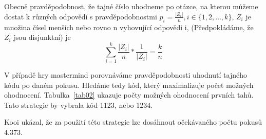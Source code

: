Obecně pravděpodobnost, že tajné číslo uhodneme po otázce, na kterou můžeme dostat k různých odpovědí s pravděpodobnostmi $p_i = \frac{|Z_i|}{n}, i \in \{1, 2, \dots, k\}$, $Z_i$ je množina čísel menších nebo rovno n vyhovující odpovědi i, (Předpokládáme, že $Z_i$ jsou disjunktní) je 
\[\sum_{i = 1}^k \frac{|Z_i|}{n}*\frac{1}{|Z_i|} = \frac{k}{n}\]

V případě hry mastermind porovnáváme pravděpodobnosti uhodnutí tajného kódu po daném pokusu. Hledáme tedy kód, který maximalizuje počet možných ohodnocení. Tabulka~\ref{tab02} ukazuje počty možných ohodnocení prvních tahů. Tato strategie by vybrala kód 1123, nebo 1234. 

Kooi ukázal, že za použití této strategie lze dosáhnout očekávaného počtu pokusů $4.373$.









